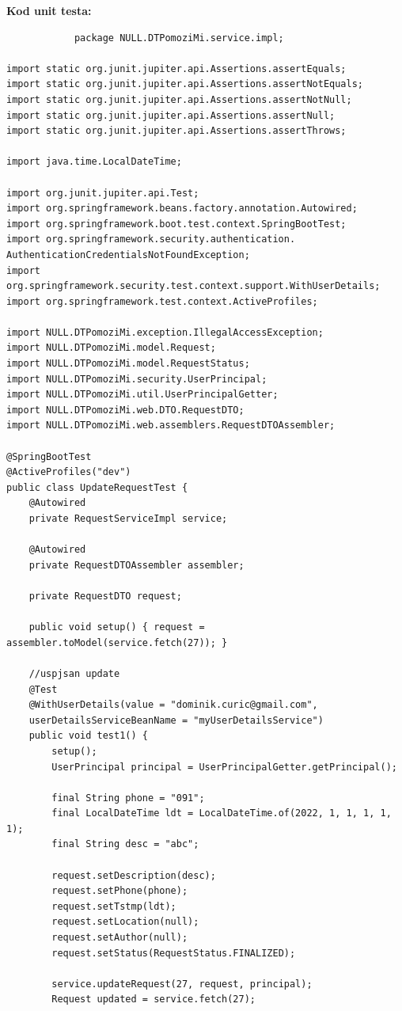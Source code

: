             \noindent \textbf{Kod unit testa: }
            \begin{verbatim}
            package NULL.DTPomoziMi.service.impl;

import static org.junit.jupiter.api.Assertions.assertEquals;
import static org.junit.jupiter.api.Assertions.assertNotEquals;
import static org.junit.jupiter.api.Assertions.assertNotNull;
import static org.junit.jupiter.api.Assertions.assertNull;
import static org.junit.jupiter.api.Assertions.assertThrows;

import java.time.LocalDateTime;

import org.junit.jupiter.api.Test;
import org.springframework.beans.factory.annotation.Autowired;
import org.springframework.boot.test.context.SpringBootTest;
import org.springframework.security.authentication.
AuthenticationCredentialsNotFoundException;
import org.springframework.security.test.context.support.WithUserDetails;
import org.springframework.test.context.ActiveProfiles;

import NULL.DTPomoziMi.exception.IllegalAccessException;
import NULL.DTPomoziMi.model.Request;
import NULL.DTPomoziMi.model.RequestStatus;
import NULL.DTPomoziMi.security.UserPrincipal;
import NULL.DTPomoziMi.util.UserPrincipalGetter;
import NULL.DTPomoziMi.web.DTO.RequestDTO;
import NULL.DTPomoziMi.web.assemblers.RequestDTOAssembler;

@SpringBootTest
@ActiveProfiles("dev")
public class UpdateRequestTest {
	@Autowired
	private RequestServiceImpl service;

	@Autowired
	private RequestDTOAssembler assembler;

	private RequestDTO request;

	public void setup() { request = assembler.toModel(service.fetch(27)); }

	//uspjsan update
	@Test
	@WithUserDetails(value = "dominik.curic@gmail.com",
	userDetailsServiceBeanName = "myUserDetailsService")
	public void test1() {
		setup();
		UserPrincipal principal = UserPrincipalGetter.getPrincipal();

		final String phone = "091";
		final LocalDateTime ldt = LocalDateTime.of(2022, 1, 1, 1, 1, 1);
		final String desc = "abc";

		request.setDescription(desc);
		request.setPhone(phone);
		request.setTstmp(ldt);
		request.setLocation(null);
		request.setAuthor(null);
		request.setStatus(RequestStatus.FINALIZED);

		service.updateRequest(27, request, principal);
		Request updated = service.fetch(27);


\end{verbatim}
